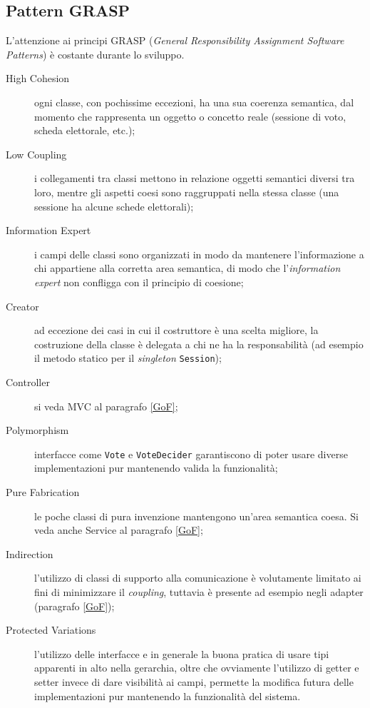 \subsection{Pattern GRASP}
L'attenzione ai principi GRASP (\emph{General Responsibility Assignment Software Patterns}) è costante durante lo sviluppo.
\begin{description}
	\item[High Cohesion] ogni classe, con pochissime eccezioni, ha una sua coerenza semantica, dal momento che rappresenta un oggetto o concetto reale (sessione di voto, scheda elettorale, etc.);
	\item[Low Coupling] i collegamenti tra classi mettono in relazione oggetti semantici diversi tra loro, mentre gli aspetti coesi sono raggruppati nella stessa classe (una sessione ha alcune schede elettorali);
	\item[Information Expert] i campi delle classi sono organizzati in modo da mantenere l'informazione a chi appartiene alla corretta area semantica, di modo che l'\emph{information expert} non confligga con il principio di coesione;
	\item[Creator] ad eccezione dei casi in cui il costruttore è una scelta migliore, la costruzione della classe è delegata a chi ne ha la responsabilità (ad esempio il metodo statico per il \emph{singleton} \verb!Session!);
	\item[Controller] si veda MVC al paragrafo \ref{GoF};
	\item[Polymorphism] interfacce come \verb!Vote! e \verb!VoteDecider! garantiscono di poter usare diverse implementazioni pur mantenendo valida la funzionalità;
	\item[Pure Fabrication] le poche classi di pura invenzione mantengono un'area semantica coesa. Si veda anche Service al paragrafo \ref{GoF};
	\item[Indirection] l'utilizzo di classi di supporto alla comunicazione è volutamente limitato ai fini di minimizzare il \emph{coupling}, tuttavia è presente ad esempio negli adapter (paragrafo \ref{GoF});
	\item[Protected Variations] l'utilizzo delle interfacce e in generale la buona pratica di usare tipi apparenti in alto nella gerarchia, oltre che ovviamente l'utilizzo di getter e setter invece di dare visibilità ai campi, permette la modifica futura delle implementazioni pur mantenendo la funzionalità del sistema.
\end{description}




